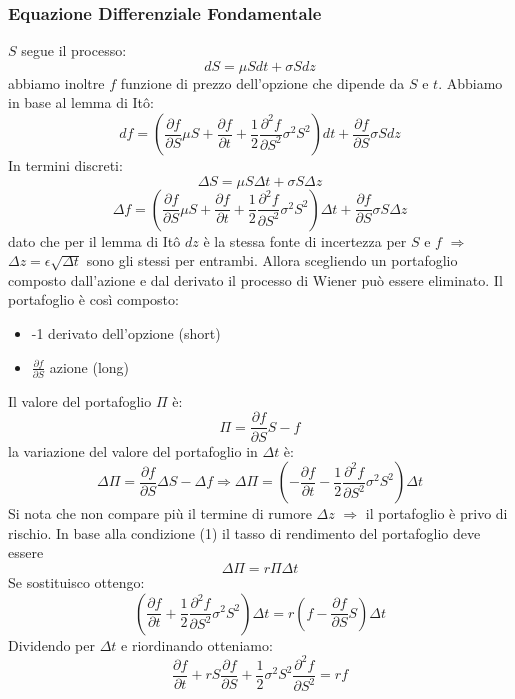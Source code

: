 \documentclass[12pt,a4paper]{report}
\begin{document}
\subsubsection{Equazione Differenziale Fondamentale}
\(S\) segue il processo:
\[
dS = \mu S dt + \sigma S dz
\]
abbiamo inoltre \(f\) funzione di prezzo dell'opzione che dipende da \(S\) e \(t\).
\newline
Abbiamo in base al lemma di Itô:
\[
df = \left(\frac{\partial f}{\partial S}\mu S + \frac{\partial f}{\partial t} + \frac{1}{2} \frac{\partial^2 f}{\partial S^2} \sigma^2 S^2 \right) dt + \frac{\partial f}{\partial S} \sigma S dz
\]
In termini discreti:
\[
\Delta S = \mu S \Delta t + \sigma S \Delta z
\]
\[
\Delta f = \left(\frac{\partial f}{\partial S}\mu S + \frac{\partial f}{\partial t} + \frac{1}{2} \frac{\partial^2 f}{\partial S^2} \sigma^2 S^2 \right) \Delta t + \frac{\partial f}{\partial S} \sigma S \Delta z
\]
dato che per il lemma di Itô \(dz\) è la stessa fonte di incertezza per \(S\) e \(f\) \(\Longrightarrow\) \(\Delta z = \epsilon \sqrt{\Delta t}\) sono gli stessi per entrambi.
\newline
Allora scegliendo un portafoglio composto dall'azione e dal derivato il processo di Wiener può essere eliminato.
\newline
Il portafoglio è così composto:
\begin{itemize}
    \item -1 derivato dell'opzione (short)
    \item \(\frac{\partial f}{\partial S}\) azione (long)
\end{itemize}
Il valore del portafoglio \(\Pi\) è:
\[
\Pi = \frac{\partial f}{\partial S} S - f
\]
la variazione del valore del portafoglio in \(\Delta t\) è:
\[
\Delta \Pi = \frac{\partial f}{\partial S} \Delta S - \Delta f \Longrightarrow \Delta \Pi = \left( -\frac{\partial f}{\partial t} - \frac{1}{2} \frac{\partial^2 f}{\partial S^2} \sigma^2 S^2 \right) \Delta t
\]
Si nota che non compare più il termine di rumore \(\Delta z\) \(\Longrightarrow\) il portafoglio è privo di rischio.
\newline
In base alla condizione (1) il tasso di rendimento del portafoglio deve essere
\[
\Delta \Pi = r \Pi \Delta t
\]
Se sostituisco ottengo:
\[
\left( \frac{\partial f}{\partial t} + \frac{1}{2} \frac{\partial^2 f}{\partial S^2} \sigma^2 S^2 \right) \Delta t = r \left( f - \frac{\partial f}{\partial S} S \right) \Delta t
\]
Dividendo per \(\Delta t\) e riordinando otteniamo:
\[
\frac{\partial f}{\partial t} + r S \frac{\partial f}{\partial S} + \frac{1}{2} \sigma^2 S^2 \frac{\partial^2 f}{\partial S^2} = r f
\]
\end{document}
